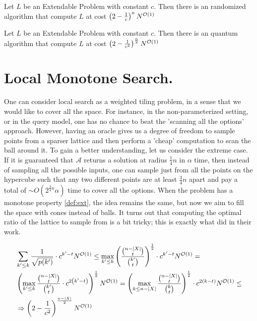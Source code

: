 \documentclass[manuscript,screen,review]{acmart}
\begin{document}
\begin{theorem} 
	\label{thm:classic}
  Let $L$ be an Extendable Problem with constant $c$. Then there is an randomized algorithm that compute $L$ at cost $ \left(2-\frac{1}{c}\right)^{ n }N^{{\mathcal{O}}(1)}$
\end{theorem}

\begin{theorem} 
	\label{thm:quantum}
  Let $L$ be an Extendable Problem with constant $c$. Then there is an quantum algorithm that compute $L$ at cost $ \left(2-\frac{1}{c^{2}}\right)^{ \frac{n}{2} }N^{{\mathcal{O}}(1)}$
\end{theorem}
\section{ Local Monotone Search. }
One can consider local search as a weighted tiling problem, in a sense that we would like to cover all the space. For instance, in the non-parameterized setting, or in the query model, one has no chance to beat the 'scanning all the options' approach. However, having an oracle gives us a degree of freedom to sample points from a sparser lattice and then perform a 'cheap' computation to scan the ball around it. To gain a better understanding, let us consider the extreme case. If it is guaranteed that $\mathcal{A}$ returns a solution at radius $\frac{1}{4}n$ in $\alpha$ time, then instead of sampling all the possible inputs, one can sample just from all the points on the hypercube such that any two different points are at least $\frac{3}{4}n$ apart and pay a total of $\sim O\left( 2^{\frac{3}{4}n} \alpha \right)$ time to cover all the options.
When the problem has a monotone property \cref{def:ext}, the idea remains the same, but now we aim to fill the space with cones instead of balls. It turns out that computing the optimal ratio of the lattice to sample from is a bit tricky; this is exactly what \cite{fomin2015exact} did in their work.

 

\begin{equation*}
  \begin{split}    
    & \sum_{k' \leq k}   \frac{1}{ \sqrt{ p(k') } } \cdot c^{k'-t} N^{{\mathcal{O}}(1)} \leq  \max_{k' \leq k} \left( \frac{{n - |X| \choose t}}{{k' \choose t}} \right)^{\frac{1}{2}} \cdot c^{k'-t} N^{{\mathcal{O}}(1)} = \\ 
    & \left( \max_{k' \leq k} \frac{{n - |X| \choose t}}{{k' \choose t}}  \cdot c^{2 \left( k'-t \right) } \right)^{\frac{1}{2}} N^{{\mathcal{O}}(1) } =  \left( \max_{k \leq n-|X|} \frac{{n - |X| \choose t}}{{k \choose t}} \right)^{\frac{1}{2}} \cdot c^{ 2 \left(  k-t \right) } N^{{\mathcal{O}}(1)} \le \\ 
    & \Rightarrow  \left(2-\frac{1}{c^{2}}\right)^{ \frac{ n-|X|}{2} }N^{{\mathcal{O}}(1)}
  \end{split}
\end{equation*}
\end{document}
